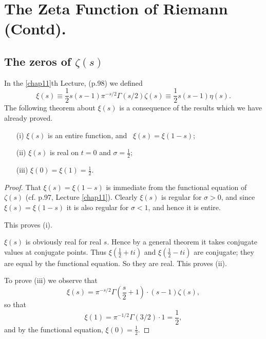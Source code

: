 \chapter{The Zeta Function of Riemann (Contd).}\label{chap13}

\setcounter{section}{7}
\section[The zeros of $\zeta(s)$]{The zeros of {\boldmath$\zeta(s)$}}\label{chap13:sec8}\pageoriginale

In the \ref{chap11}th Lecture, (p.98) we defined 
$$
\xi (s) \equiv \frac{1}{2} s (s-1) \pi^{-s/2}\Gamma (s/2) \zeta (s)
\equiv \frac{1}{2} s (s-1) \eta (s). 
$$
The following theorem about $\xi(s)$ is a consequence of the results
which we have already proved.

\setcounter{thm}{0}
\begin{thm}\cite[p.45]{key11}\label{chap13:thm1}
\begin{itemize}
\item[(i)] $\xi (s)$ is an entire function, and \
$\xi(s) = \xi (1-s)$;

\item[(ii)] $\xi (s)$ is real on $t=0$ and $\sigma =\frac{1}{2}$;

\item[(iii)] $\xi (0) = \xi (1) = \frac{1}{2}$.
\end{itemize}
\end{thm}

\begin{proof}
That $\xi (s) = \xi (1-s)$ is immediate from the functional equation
of $\zeta(s)$ (cf. p.97, Lecture \ref{chap11}). Clearly $\xi(s)$ is regular for
$\sigma >0$, and since $\xi (s) = \xi (1-s)$ it is also regular for
$\sigma < 1$, and hence it is entire.

This proves (i). 

$\xi (s)$ is obviously real for real $s$. Hence by a general theorem
it takes conjugate values at conjugate points. Thus $\xi \left(\frac{1}{2}
+ t i\right)$ and $\xi \left(\frac{1}{2} - ti\right)$ are conjugate; they are equal by
the functional equation. So they are real. This proves (ii).

To prove (iii) we observe that
$$
\xi (s) = \pi^{-s/2} \Gamma \left(\frac{s}{2}+1 \right) \cdot (s-1) \zeta(s),
$$
so that
$$
\xi (1) = \pi^{-1/2} \Gamma (3/2) \cdot 1 =\frac{1}{2},
$$
and by the functional equation, $\xi(0) =\frac{1}{2}$.
\end{proof}


